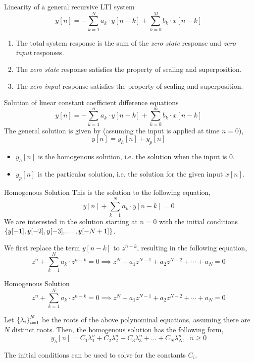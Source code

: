 \documentclass[aspectratio=169]{beamer}
\let\olditem\item
\renewcommand{\item}{\setlength{\itemsep}{\fill}\olditem}
\def\lc{\ensuremath\left\{}
\def\rc{\ensuremath\right\}}
\begin{document}
\begin{frame}[t]{Linearity of a general recursive LTI system}
\[ y[n] = -\sum_{k=1}^N a_k \cdot y[n - k] + \sum_{k=0}^{M} b_k \cdot x[n-k] \]
\begin{enumerate}
  \item The total system response is the sum of the \textit{zero state} response and \textit{zero input} responses.
  \item The \textit{zero state} response satisfies the property of scaling and superposition.
  \item The \textit{zero input} response satisfies the property of scaling and superposition.
\end{enumerate}
\end{frame}

\begin{frame}[t]{Solution of linear constant coefficient difference equations}
\[ y[n] = -\sum_{k=1}^n a_k \cdot y[n - k] + \sum_{k=0}^{m} b_k \cdot x[n-k] \]
The general solution is given by (assuming the input is applied at time $n = 0$),
\[ y[n] = y_{h}[n] + y_p[n] \]
\begin{itemize}
  \item  $y_h[n]$ is the homogenous solution, i.e. the solution when the input is $0$.
  \item  $y_p[n]$ is the particular solution, i.e. the solution for the given input $x[n]$.
\end{itemize}
\end{frame}

\begin{frame}[t]{Homogenous Solution}
This is the solution to the following equation,
\[ y[n] + \sum_{k=1}^N a_k \cdot y[n - k] = 0\]
We are interested in the solution starting at $n=0$ with the initial conditions $\lc y[-1], y[-2], y[-3], \ldots, y[-N+1]\rc$.

\vspace{0.5cm} 

We first replace the term $y[n-k]$ to $z^{n-k}$, resulting in the following equation,
\[ z^n + \sum_{k=1}^N a_k \cdot z^{n - k} = 0 \implies z^N + a_1z^{N-1} + a_2z^{N-2} + \cdots + a_N = 0 \] 
\end{frame}


\begin{frame}[t]{Homogenous Solution}
\[ z^n + \sum_{k=1}^N a_k \cdot z^{n - k} = 0 \implies z^N + a_1z^{N-1} + a_2z^{N-2} + \cdots + a_N = 0 \]

Let $\lc \lambda_i \rc_{i=1}^N$ be the roots of the above polynominal equations, assuming there are $N$ distinct roots. Then, the homogenous solution has the following form,
\[ y_h[n] = C_1 \lambda_1^n + C_2 \lambda_2^n + C_3 \lambda_3^n + \ldots + C_N \lambda_N^n , \,\,\ n \geq 0 \]

The initial conditions can be used to solve for the constants $C_i$.
\end{frame}
\end{document}

